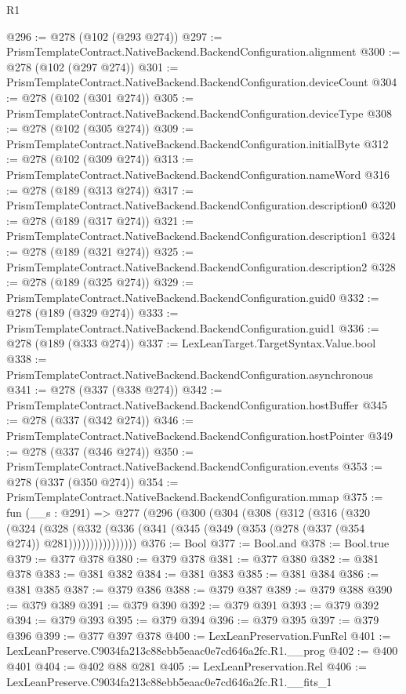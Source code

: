\begin{lexlean}{R1}
\begin{coremodule}
@296 := @278 (@102 (@293 @274))
@297 := PrismTemplateContract.NativeBackend.BackendConfiguration.alignment
@300 := @278 (@102 (@297 @274))
@301 := PrismTemplateContract.NativeBackend.BackendConfiguration.deviceCount
@304 := @278 (@102 (@301 @274))
@305 := PrismTemplateContract.NativeBackend.BackendConfiguration.deviceType
@308 := @278 (@102 (@305 @274))
@309 := PrismTemplateContract.NativeBackend.BackendConfiguration.initialByte
@312 := @278 (@102 (@309 @274))
@313 := PrismTemplateContract.NativeBackend.BackendConfiguration.nameWord
@316 := @278 (@189 (@313 @274))
@317 := PrismTemplateContract.NativeBackend.BackendConfiguration.description0
@320 := @278 (@189 (@317 @274))
@321 := PrismTemplateContract.NativeBackend.BackendConfiguration.description1
@324 := @278 (@189 (@321 @274))
@325 := PrismTemplateContract.NativeBackend.BackendConfiguration.description2
@328 := @278 (@189 (@325 @274))
@329 := PrismTemplateContract.NativeBackend.BackendConfiguration.guid0
@332 := @278 (@189 (@329 @274))
@333 := PrismTemplateContract.NativeBackend.BackendConfiguration.guid1
@336 := @278 (@189 (@333 @274))
@337 := LexLeanTarget.TargetSyntax.Value.bool
@338 := PrismTemplateContract.NativeBackend.BackendConfiguration.asynchronous
@341 := @278 (@337 (@338 @274))
@342 := PrismTemplateContract.NativeBackend.BackendConfiguration.hostBuffer
@345 := @278 (@337 (@342 @274))
@346 := PrismTemplateContract.NativeBackend.BackendConfiguration.hostPointer
@349 := @278 (@337 (@346 @274))
@350 := PrismTemplateContract.NativeBackend.BackendConfiguration.events
@353 := @278 (@337 (@350 @274))
@354 := PrismTemplateContract.NativeBackend.BackendConfiguration.mmap
@375 := fun (__s : @291) =>
  @277
    (@296
      (@300
        (@304
          (@308
            (@312
              (@316
                (@320
                  (@324
                    (@328
                      (@332
                        (@336 (@341 (@345 (@349 (@353 (@278 (@337 (@354 @274)) @281))))))))))))))))
@376 := Bool
@377 := Bool.and
@378 := Bool.true
@379 := @377 @378
@380 := @379 @378
@381 := @377 @380
@382 := @381 @378
@383 := @381 @382
@384 := @381 @383
@385 := @381 @384
@386 := @381 @385
@387 := @379 @386
@388 := @379 @387
@389 := @379 @388
@390 := @379 @389
@391 := @379 @390
@392 := @379 @391
@393 := @379 @392
@394 := @379 @393
@395 := @379 @394
@396 := @379 @395
@397 := @379 @396
@399 := @377 @397 @378
@400 := LexLeanPreservation.FunRel
@401 := LexLeanPreserve.C9034fa213c88ebb5eaac0e7cd646a2fc.R1.__prog
@402 := @400 @401
@404 := @402 @88 @281
@405 := LexLeanPreservation.Rel
@406 := LexLeanPreserve.C9034fa213c88ebb5eaac0e7cd646a2fc.R1.__fits_1

\end{coremodule}
\end{lexlean}
